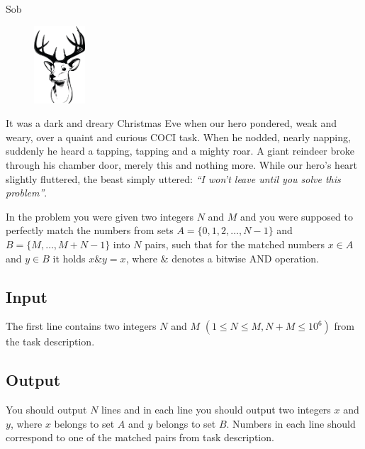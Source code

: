\begin{statement}[
  problempoints=110,
  timelimit=1 second,
  memorylimit=512 MiB,
]{Sob}

\setlength\intextsep{-0.1cm}
\begin{figure}
\centering
\includegraphics[width=0.17\textwidth]{img/sob.png}
\end{figure}

It was a dark and dreary Christmas Eve when our hero pondered, weak and weary,
over a quaint and curious COCI task. When he nodded, nearly napping, suddenly
he heard a tapping, tapping and a mighty roar. A giant reindeer broke through
his chamber door, merely this and nothing more. While our hero's heart slightly
  fluttered, the beast simply uttered: \textit{``I won't leave until you solve this problem''}.

In the problem you were given two integers $N$ and $M$ and you were supposed
to perfectly match the numbers from sets $A = \{ 0, 1, 2, \dots, N - 1 \}$ and
$B = \{ M, \dots, M + N - 1\}$ into $N$ pairs, such that for the matched numbers
$x \in A$ and $y \in B$ it holds $x \mathbin{\&} y = x$, where $\&$ denotes a
bitwise AND operation.

\subsection*{Input}
The first line contains two integers $N$ and $M$
$(1 \le N \le M, N + M \le 10^6)$ from the task description.

\subsection*{Output}
You should output $N$ lines and in each line you should output two integers $x$
and $y$, where $x$ belongs to set $A$ and $y$ belongs to set $B$. Numbers in
each line should correspond to one of the matched pairs from task description.


\end{statement}
